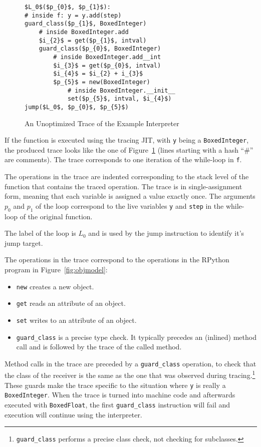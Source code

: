 \documentclass[preprint]{sigplanconf}
\begin{document}
\begin{figure}
\begin{lstlisting}[mathescape,numbers = right,basicstyle=\setstretch{1.05}\ttfamily\scriptsize]
$L_0$($p_{0}$, $p_{1}$):
# inside f: y = y.add(step)
guard_class($p_{1}$, BoxedInteger)
    # inside BoxedInteger.add
    $i_{2}$ = get($p_{1}$, intval)
    guard_class($p_{0}$, BoxedInteger)
        # inside BoxedInteger.add__int
        $i_{3}$ = get($p_{0}$, intval)
        $i_{4}$ = $i_{2} + i_{3}$
        $p_{5}$ = new(BoxedInteger)
            # inside BoxedInteger.__init__
            set($p_{5}$, intval, $i_{4}$)
jump($L_0$, $p_{0}$, $p_{5}$)
\end{lstlisting}
\caption{An Unoptimized Trace of the Example Interpreter}
\label{fig:unopt-trace}
\end{figure}

If the function is executed using the tracing JIT, with \lstinline{y} being a
\lstinline{BoxedInteger}, the produced trace looks like the one of
Figure~\ref{fig:unopt-trace} (lines starting with a hash ``\#'' are comments).
The trace corresponds to one iteration of the while-loop in \lstinline{f}.

The operations in the trace are indented
corresponding to the stack level of the function that contains the traced
operation. The trace is in single-assignment form, meaning that each variable is
assigned a value exactly once. The arguments $p_0$ and $p_1$ of the loop correspond
to the live variables \lstinline{y} and \lstinline{step} in the while-loop of
the original function.

The label of the loop is $L_0$ and is used by the jump instruction to
identify it's jump target.

The operations in the trace correspond to the operations in the RPython program
in Figure~\ref{fig:objmodel}:

\begin{itemize}
    \item \lstinline{new} creates a new object.
    \item \lstinline{get} reads an attribute of an object.
    \item \lstinline{set} writes to an attribute of an object.
    \item \lstinline{guard_class} is a precise type check. It typically precedes
    an (inlined) method call and is followed by the trace of the called method.
\end{itemize}

Method calls in the trace are preceded by a \lstinline{guard_class}
operation, to check that the class of the receiver is the same as the one that
was observed during tracing.\footnote{\lstinline{guard_class}
performs a precise
class check, not checking for subclasses.} These guards make the trace specific
to the situation where \lstinline{y} is really a \lstinline{BoxedInteger}. When
the trace is turned into machine code and afterwards executed with
\lstinline{BoxedFloat}, the
first \lstinline{guard_class} instruction will fail and execution will continue
using the interpreter.
\end{document}
